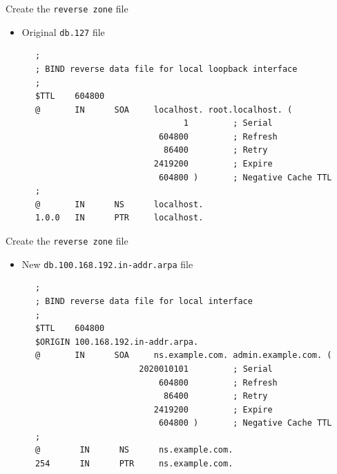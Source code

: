 \documentclass[xcolor=table]{beamer}
\begin{document}
\begin{frame}[fragile]{Create the \texttt{reverse zone} file}
  \begin{itemize}
    \item Original \texttt{db.127} file
  \end{itemize}
  \begin{tcolorbox}
    \lstset{
      basicstyle=\tiny\ttfamily,
    }
    \begin{lstlisting}
      ;
      ; BIND reverse data file for local loopback interface
      ;
      $TTL    604800
      @       IN      SOA     localhost. root.localhost. (
                                    1         ; Serial
                               604800         ; Refresh
                                86400         ; Retry
                              2419200         ; Expire
                               604800 )       ; Negative Cache TTL
      ;
      @       IN      NS      localhost.
      1.0.0   IN      PTR     localhost.
    \end{lstlisting}
  \end{tcolorbox}
\end{frame}

\begin{frame}[fragile]{Create the \texttt{reverse zone} file}
  \begin{itemize}
    \item New \texttt{db.100.168.192.in-addr.arpa} file
  \end{itemize}
  \begin{tcolorbox}
    \lstset{
      basicstyle=\tiny\ttfamily,
    }
    \begin{lstlisting}
      ;
      ; BIND reverse data file for local interface
      ;
      $TTL    604800
      $ORIGIN 100.168.192.in-addr.arpa.
      @       IN      SOA     ns.example.com. admin.example.com. (
                           2020010101         ; Serial
                               604800         ; Refresh
                                86400         ; Retry
                              2419200         ; Expire
                               604800 )       ; Negative Cache TTL
      ;
      @        IN      NS      ns.example.com.
      254      IN      PTR     ns.example.com.
          \end{lstlisting}
  \end{tcolorbox}
\end{frame}
\end{document}
